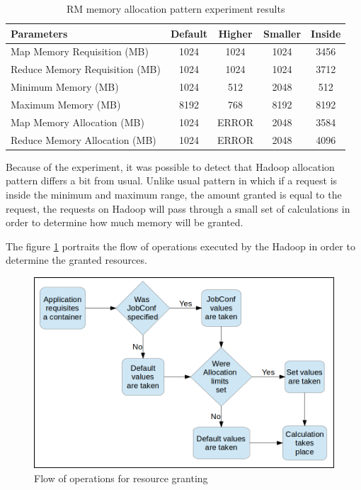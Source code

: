\begin{table}
	\renewcommand{\figurename}{Table}
	\centering
	\begin{tabular}{|l|c|c|c|c|}
		\hline 
		Parameters & Default & Higher & Smaller & Inside\\ 
		\hline 
		Map Memory Requisition (MB) & 1024 & 1024 & 1024 & 3456\\ 
		\hline 
		Reduce Memory Requisition (MB) & 1024 & 1024 & 1024 & 3712\\ 
		\hline 
		Minimum Memory (MB) & 1024 & 512 & 2048 & 512\\ 
		\hline 
		Maximum Memory (MB) & 8192 & 768 & 8192 & 8192\\ 
		\hline 
		Map Memory Allocation (MB) & 1024 & ERROR & 2048 & 3584\\
		\hline
		Reduce Memory Allocation (MB) & 1024 & ERROR & 2048 & 4096\\ 
		\hline 		
	\end{tabular}
	\caption{RM memory allocation pattern experiment results}
	\label{tab:memory allocation}
\end{table}

%

Because of the experiment, it was possible to detect that Hadoop allocation pattern differs a bit from usual. Unlike usual pattern in which if a request is inside the minimum and maximum range, the amount granted is equal to the request, the requests on Hadoop will pass through a small set of calculations in order to determine how much memory will be granted.

The figure \ref{fig:fluxoAllocation} portraits the  flow of operations executed by the Hadoop in order to determine the granted resources.

\begin{figure}[!hbtn]
   \renewcommand{\figurename}{Figure}
   \centering
   \includegraphics[width=15cm]{figuras/Figura18-allocflow.png}
   \caption{Flow of operations for resource granting}
   \label{fig:fluxoAllocation}
\end{figure}

